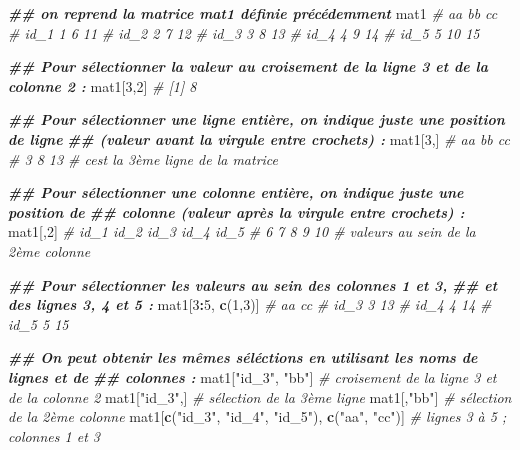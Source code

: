 \documentclass[
]{book}
\newenvironment{Shaded}{\begin{snugshade}}{\end{snugshade}}
\newcommand{\CommentTok}[1]{\textcolor[rgb]{0.56,0.35,0.01}{\textit{#1}}}
\newcommand{\DecValTok}[1]{\textcolor[rgb]{0.00,0.00,0.81}{#1}}
\newcommand{\DocumentationTok}[1]{\textcolor[rgb]{0.56,0.35,0.01}{\textbf{\textit{#1}}}}
\newcommand{\FunctionTok}[1]{\textcolor[rgb]{0.13,0.29,0.53}{\textbf{#1}}}
\newcommand{\NormalTok}[1]{#1}
\newcommand{\SpecialCharTok}[1]{\textcolor[rgb]{0.81,0.36,0.00}{\textbf{#1}}}
\newcommand{\StringTok}[1]{\textcolor[rgb]{0.31,0.60,0.02}{#1}}
\begin{document}
\begin{Shaded}
\begin{Highlighting}[]
\DocumentationTok{\#\# on reprend la matrice mat1 définie précédemment}
\NormalTok{mat1}
\CommentTok{\#      aa bb cc}
\CommentTok{\# id\_1  1  6 11}
\CommentTok{\# id\_2  2  7 12}
\CommentTok{\# id\_3  3  8 13}
\CommentTok{\# id\_4  4  9 14}
\CommentTok{\# id\_5  5 10 15}

\DocumentationTok{\#\# Pour sélectionner la valeur au croisement de la ligne 3 et de la colonne 2 :}
\NormalTok{mat1[}\DecValTok{3}\NormalTok{,}\DecValTok{2}\NormalTok{] }\CommentTok{\# [1] 8}

\DocumentationTok{\#\# Pour sélectionner une ligne entière, on indique juste une position de ligne }
\DocumentationTok{\#\# (valeur avant la virgule entre crochets) :}
\NormalTok{mat1[}\DecValTok{3}\NormalTok{,]}
\CommentTok{\# aa bb cc }
\CommentTok{\#  3  8 13      \# c\textquotesingle{}est la 3ème ligne de la matrice}

\DocumentationTok{\#\# Pour sélectionner une colonne entière, on indique juste une position de }
\DocumentationTok{\#\# colonne (valeur après la virgule entre crochets) :}
\NormalTok{mat1[,}\DecValTok{2}\NormalTok{]}
\CommentTok{\# id\_1 id\_2 id\_3 id\_4 id\_5 }
\CommentTok{\#    6    7    8    9   10      \# valeurs au sein de la 2ème colonne}

\DocumentationTok{\#\# Pour sélectionner les valeurs au sein des colonnes 1 et 3, }
\DocumentationTok{\#\# et des lignes 3, 4 et 5 : }
\NormalTok{mat1[}\DecValTok{3}\SpecialCharTok{:}\DecValTok{5}\NormalTok{, }\FunctionTok{c}\NormalTok{(}\DecValTok{1}\NormalTok{,}\DecValTok{3}\NormalTok{)]}
\CommentTok{\#      aa cc}
\CommentTok{\# id\_3  3 13}
\CommentTok{\# id\_4  4 14}
\CommentTok{\# id\_5  5 15}

\DocumentationTok{\#\# On peut obtenir les mêmes séléctions en utilisant les noms de lignes et de }
\DocumentationTok{\#\# colonnes : }
\NormalTok{mat1[}\StringTok{"id\_3"}\NormalTok{, }\StringTok{"bb"}\NormalTok{] }\CommentTok{\# croisement de la ligne 3 et de la colonne 2}
\NormalTok{mat1[}\StringTok{"id\_3"}\NormalTok{,] }\CommentTok{\# sélection de la 3ème ligne}
\NormalTok{mat1[,}\StringTok{"bb"}\NormalTok{] }\CommentTok{\# sélection de la 2ème colonne}
\NormalTok{mat1[}\FunctionTok{c}\NormalTok{(}\StringTok{"id\_3"}\NormalTok{, }\StringTok{"id\_4"}\NormalTok{, }\StringTok{"id\_5"}\NormalTok{), }\FunctionTok{c}\NormalTok{(}\StringTok{"aa"}\NormalTok{, }\StringTok{"cc"}\NormalTok{)] }\CommentTok{\# lignes 3 à 5 ; colonnes 1 et 3 }


\end{Highlighting}
\end{Shaded}
\end{document}
